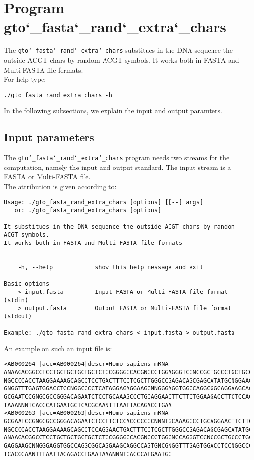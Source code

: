 \section{Program gto\char`_fasta\char`_rand\char`_extra\char`_chars}
The \texttt{gto\char`_fasta\char`_rand\char`_extra\char`_chars} substitues in the DNA sequence the outside ACGT chars by random ACGT symbols. It works both in FASTA and Multi-FASTA file formats.\\
For help type:
\begin{lstlisting}
./gto_fasta_rand_extra_chars -h
\end{lstlisting}
In the following subsections, we explain the input and output paramters.

\subsection*{Input parameters}

The \texttt{gto\char`_fasta\char`_rand\char`_extra\char`_chars} program needs two streams for the computation, namely the input and output standard. The input stream is a FASTA or Multi-FASTA file.\\
The attribution is given according to:
\begin{lstlisting}
Usage: ./gto_fasta_rand_extra_chars [options] [[--] args]
   or: ./gto_fasta_rand_extra_chars [options]

It substitues in the DNA sequence the outside ACGT chars by random ACGT symbols.
It works both in FASTA and Multi-FASTA file formats


    -h, --help            show this help message and exit

Basic options
    < input.fasta         Input FASTA or Multi-FASTA file format (stdin)
    > output.fasta        Output FASTA or Multi-FASTA file format (stdout)

Example: ./gto_fasta_rand_extra_chars < input.fasta > output.fasta
\end{lstlisting}
An example on such an input file is:
\begin{lstlisting}
>AB000264 |acc=AB000264|descr=Homo sapiens mRNA 
ANAAGACGGCCTCCTGCTGCTGCTGCTCTCCGGGGCCACGNCCCTGGAGGGTCCNCCGCTGCCCTGCTGCCATTGNCNCC
NGCCCCACCTAAGGAAAAGCAGCCTCCTGACTTTCCTCGCTTGGGCCGAGACAGCGAGCATATGCNGGAAGCGGCAGGAA
GNGGTTTGAGTGGACCTCCNGGCCCCTCATAGGAGAGGAAGCNNGGGAGGTGGCCAGGCGGCAGGAAGCAGGCCAGTGNC
GCGAATCCGNGCGCCGGGACAGAATCTCCTGCAAAGCCCTGCAGGAACTTCTTCTGGAAGACCTTCTCCACCCCCCCNNN
TAAANNNTCACCCATGAATGCTCACGCAANTTTAATTACAGACCTGAA
>AB000263 |acc=AB000263|descr=Homo sapiens mRNA 
GCGAATCCGNGCGCCGGGACAGAATCTCCTTCTCCACCCCCCCNNNTGCAAAGCCCTGCAGGAACTTCTTCTGGAAGACC
NGCCCCACCTAAGGAAAAGCAGCCTCCAGGAACTGACTTTCCTCGCTTGGGCCGAGACAGCGAGCATATGCNGGAAGCGG
ANAAGACGGCCTCCTGCTGCTGCTGCTCTCCGGGGCCACGNCCCTGGCNCCAGGGTCCNCCGCTGCCCTGCTGCCATTGN
GAGGAAGCNNGGGAGGTGGCCAGGCGGCAGGAAGCAGGCCAGTGNCGNGGTTTGAGTGGACCTCCNGGCCCCTCATAGGA
TCACGCAANTTTAATTACAGACCTGAATAAANNNTCACCCATGAATGC
\end{lstlisting}

